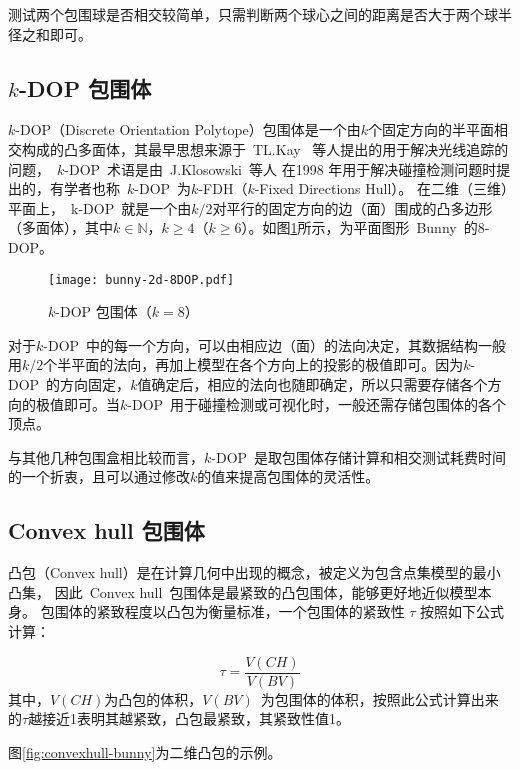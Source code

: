 测试两个包围球是否相交较简单，只需判断两个球心之间的距离是否大于两个球半径之和即可。

\subsection{$k$-DOP 包围体}

$k$-DOP（Discrete Orientation Polytope）包围体是一个由$k$个固定方向的半平面相交构成的凸多面体，其最早思想来源于~TL.Kay~\cite{Kay1986Ray}
等人提出的用于解决光线追踪的问题，~$k$-DOP~术语是由~J.Klosowski~等人\cite{klosowski1998efficient}
在1998 年用于解决碰撞检测问题时提出的，有学者也称~$k$-DOP~为$k$-FDH（$k$-Fixed
Directions Hull）\cite{weiyingmei2001}。
在二维（三维）平面上，~k-DOP~就是一个由$k/2$对平行的固定方向的边（面）围成的凸多边形（多面体），其中$k\in\mathbb{N}$，$k\geq4$（$k\geq6$）。如图\ref{fig:8dop-bunny}所示，为平面图形~Bunny~的$8$-DOP。

\begin{figure}[H] %
  \centering
  \texttt{[image: bunny-2d-8DOP.pdf]}
  \caption{$k$-DOP 包围体（$k=8$）}
  \label{fig:8dop-bunny}
\end{figure}

对于$k$-DOP~中的每一个方向，可以由相应边（面）的法向决定，其数据结构一般用$k/2$个半平面的法向，再加上模型在各个方向上的投影的极值即可。因为$k$-DOP~的方向固定，$k$值确定后，相应的法向也随即确定，所以只需要存储各个方向的极值即可。当$k$-DOP~用于碰撞检测或可视化时，一般还需存储包围体的各个顶点。

与其他几种包围盒相比较而言，$k$-DOP~是取包围体存储计算和相交测试耗费时间的一个折衷，且可以通过修改$k$的值来提高包围体的灵活性。

\subsection{Convex hull 包围体}

凸包（Convex hull）是在计算几何中出现的概念，被定义为包含点集模型的最小凸集\cite{dengcg}，
因此~Convex hull~包围体是最紧致的凸包围体，能够更好地近似模型本身。
包围体的紧致程度以凸包为衡量标准，一个包围体的紧致性 $\tau$ 按照如下公式计算：

\begin{equation}
\tau = \frac{V(CH)}{V(BV)}
\end{equation}
其中，$V(CH)$为凸包的体积，$V(BV)$~为包围体的体积，按照此公式计算出来的$\tau$越接近1表明其越紧致，凸包最紧致，其紧致性值1。

图\ref{fig:convexhull-bunny}为二维凸包的示例。

